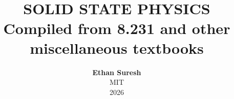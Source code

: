 \documentclass[openany,oneside]{book}
\begin{document}
\title{ \normalsize \textsc{}
		\\ [2.0cm]
		\HRule{1.5pt} \\
		\LARGE \textbf{\uppercase{Solid State Physics}
		\HRule{2.0pt} \\ [0.6cm] \LARGE{Compiled from 8.231 and other miscellaneous textbooks} \vspace*{10\baselineskip}}
		}
\date{}
\author{\textbf{Ethan Suresh} \\
		MIT \\
		2026}

\maketitle
\newpage

\tableofcontents
\newpage










\end{document}
